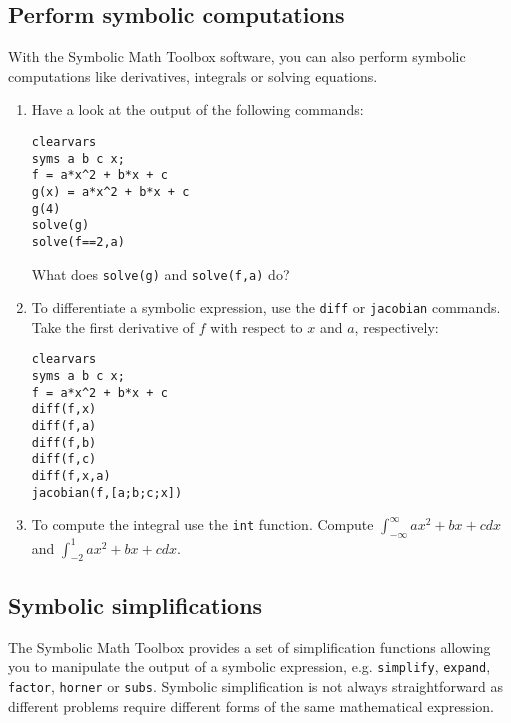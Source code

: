\subsection*{Perform symbolic computations}
With the Symbolic Math Toolbox software, you can also perform symbolic computations like derivatives, integrals or solving equations.

\begin{enumerate}[resume]
\item Have a look at the output of the following commands:
\begin{lstlisting}[style=Matlab-editor,basicstyle=\mlttfamily\scriptsize]
clearvars
syms a b c x;
f = a*x^2 + b*x + c
g(x) = a*x^2 + b*x + c
g(4)
solve(g)
solve(f==2,a)
\end{lstlisting}
  What does \texttt{solve(g)} and \texttt{solve(f,a)} do?
\item To differentiate a symbolic expression, use the \texttt{diff} or \texttt{jacobian} commands.
  Take the first derivative of $f$ with respect to $x$ and $a$, respectively:
\begin{lstlisting}[style=Matlab-editor,basicstyle=\mlttfamily\scriptsize]
clearvars
syms a b c x;
f = a*x^2 + b*x + c
diff(f,x)
diff(f,a)
diff(f,b)
diff(f,c)
diff(f,x,a)
jacobian(f,[a;b;c;x])
\end{lstlisting}
\item To compute the integral use the \texttt{int} function.
  Compute $\int_{-\infty}^\infty a x^2 + b x + c dx$ and $\int_{-2}^1 a x^2 + b x + c dx$.
\end{enumerate}

\subsection*{Symbolic simplifications}
The Symbolic Math Toolbox provides a set of simplification functions allowing you to manipulate the output of a symbolic expression, e.g.
  \texttt{simplify}, \texttt{expand}, \texttt{factor}, \texttt{horner} or \texttt{subs}.
  Symbolic simplification is not always straightforward as different problems require different forms of the same mathematical expression.
    
